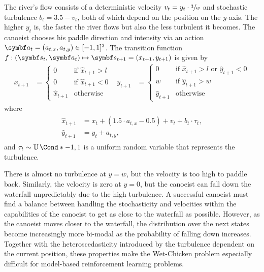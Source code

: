The river's flow consists of a deterministic velocity $v_t = y_t \cdot \sfrac{3}{w}$ and stochastic turbulence $b_t = 3.5 - v_t$, both of which depend on the position on the $y$-axis.
The higher $y_t$ is, the faster the river flows but also the less turbulent it becomes.
The canoeist chooses his paddle direction and intensity via an action $\mat{a}_t = (a_{t,x}, a_{t,y}) \in [-1, 1]^2$.
The transition function $f : (\mat{s}_t, \mat{a}_t) \mapsto \mat{s}_{t+1} = (x_{t+1}, y_{t+1})$ is given by
\begin{align}
    x_{t+1} &= \begin{cases}
        0 & \text{if } \hat{x}_{t+1} > l \\
        0 & \text{if } \hat{x}_{t+1} < 0 \\
        \hat{x}_{t+1} & \text{otherwise}
    \end{cases} &
    y_{t+1} &= \begin{cases}
        0 & \text{if } \hat{x}_{t+1} > l \text{ or } \hat{y}_{t+1} < 0 \\
        w & \text{if } \hat{y}_{t+1} > w \\
        \hat{y}_{t+1} & \text{otherwise}
    \end{cases}
\end{align}
where
\begin{align}
\begin{split}
    \hat{x}_{t+1} &= x_t + (1.5 \cdot a_{t, x} - 0.5)  + v_t + b_t \cdot \tau_t, \\
    \hat{y}_{t+1} &= y_t + a_{t, y},
\end{split}
\end{align}
and $\tau_t \sim \Fun*{\Uni}{-1, 1}$ is a uniform random variable that represents the turbulence.

There is almost no turbulence at $y = w$, but the velocity is too high to paddle back.
Similarly, the velocity is zero at $y = 0$, but the canoeist can fall down the waterfall unpredictably due to the high turbulence.
A successful canoeist must find a balance between handling the stochasticity and velocities within the capabilities of the canoeist to get as close to the waterfall as possible.
However, as the canoeist moves closer to the waterfall, the distribution over the next states become increasingly more bi-modal as the probability of falling down increases.
Together with the heteroscedasticity introduced by the turbulence dependent on the current position, these properties make the Wet-Chicken problem especially difficult for model-based reinforcement learning problems.


